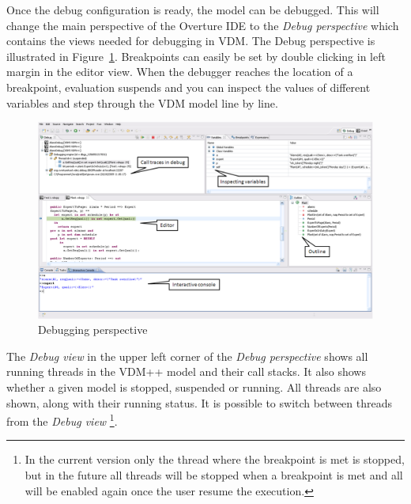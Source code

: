 Once the debug configuration is ready, the model can be debugged. This
will change the main perspective of the Overture IDE to the
\emph{Debug perspective} which contains the views needed for debugging
in VDM. The Debug perspective is illustrated in Figure~\ref{fig:DebuggingVDM}. 
Breakpoints can easily be set by double clicking in left
margin in the editor view. When the debugger reaches the location of a
breakpoint, evaluation suspends and you can inspect the values of
different variables and step through the VDM model line by line.
 

\begin{figure}[htp]
\begin{center}
  \includegraphics[width=5in]{figures/DebuggingVDM}
  \caption[Debugging perspective]{Debugging perspective}
  \label{fig:DebuggingVDM}
\end{center}
\end{figure}

The \emph{Debug view} in the upper left corner of the \emph{Debug
  perspective} shows all running threads in the VDM++ model and their
call stacks. It also shows whether a given model is stopped, suspended
or running. All threads are also shown, along with their running
status. It is possible to switch between threads from the \emph{Debug view}
\footnote{In the current version only the thread where the
  breakpoint is met is stopped, but in the future all threads will be
  stopped when a breakpoint is met and all will be enabled again once
  the user resume the execution.}.


